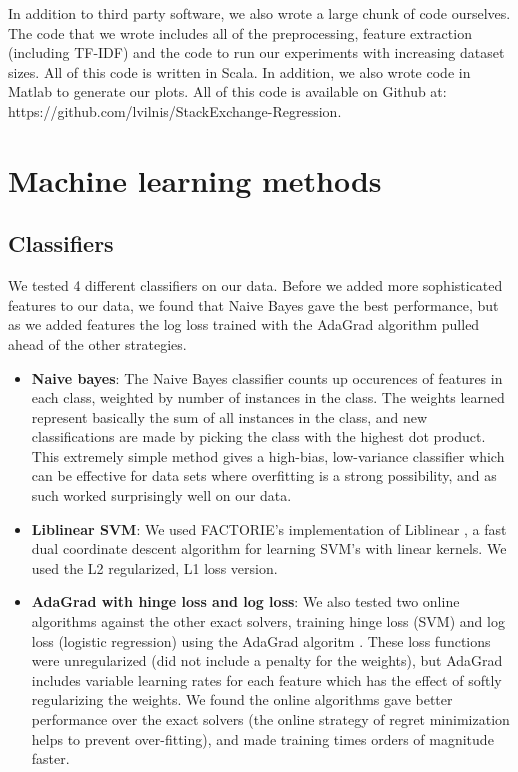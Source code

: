 \documentclass[11pt]{article}
\begin{document}
In addition to third party software, we also wrote a large chunk of
code ourselves.  The code that we wrote includes all of the
preprocessing, feature extraction (including TF-IDF) and the code to run our experiments
with increasing dataset sizes.  All of this code is written in
Scala. In addition, we also wrote code in Matlab to generate our
plots.  All of this code is available on Github at:
https://github.com/lvilnis/StackExchange-Regression.

\section{Machine learning methods}
\subsection*{Classifiers}We tested 4 different classifiers on our data. Before we added more sophisticated features to our data, we found that Naive Bayes gave the best performance, but as we added features the log loss trained with the AdaGrad algorithm pulled ahead of the other strategies.
 \begin{itemize}
\item \textbf{Naive bayes}: The Naive Bayes classifier counts up occurences of features in each class, weighted by number of instances in the class. The weights learned represent basically the sum of all instances in the class, and new classifications are made by picking the class with the highest dot product. This extremely simple method gives a high-bias, low-variance classifier which can be effective for data sets where overfitting is a strong possibility, and as such worked surprisingly well on our data.
\item \textbf{Liblinear SVM}: We used FACTORIE's implementation of Liblinear \cite{chang:08a}, a fast dual coordinate descent algorithm for learning SVM's with linear kernels. We used the L2 regularized, L1 loss version.
\item \textbf{AdaGrad with hinge loss and log loss}: We also tested two online algorithms against the other exact solvers, training hinge loss (SVM) and log loss (logistic regression) using the AdaGrad algoritm \cite{duchi:11a}. These loss functions were unregularized (did not include a penalty for the weights), but AdaGrad includes variable learning rates for each feature which has the effect of softly regularizing the weights. We found the online algorithms gave better performance over the exact solvers (the online strategy of regret minimization helps to prevent over-fitting), and made training times orders of magnitude faster.
\end{itemize}
\end{document}
